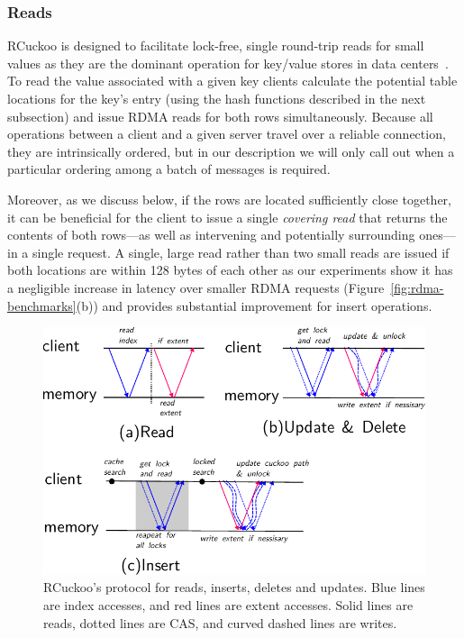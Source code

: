 \subsubsection{Reads} 
\label{sec:reading}


RCuckoo is designed to facilitate lock-free, single round-trip reads
for small values as they are the dominant operation for key/value
stores in data centers~\cite{rocks-db-workload,facebook-memcached}. To
read the value associated with a given key clients calculate the
potential table locations for the key's entry (using the hash
functions described in the next subsection) and issue RDMA reads for
both rows simultaneously.  Because all operations between a client and
a given server travel over a reliable connection, they are
intrinsically ordered, but in our description we will only call out
when a particular ordering among a batch of messages is required.


Moreover, as we discuss below, if the rows are
located sufficiently close together, it can be beneficial for the
client to issue a single \emph{covering read} that returns the
contents of both rows---as well as intervening and potentially
surrounding ones---in a single request.
A single, large read rather than two small reads are issued
if both locations are within
128 bytes of each other as our experiments show it has a negligible
increase in latency over smaller RDMA requests
(Figure~\ref{fig:rdma-benchmarks}(b)) and provides substantial
improvement for insert operations.


\begin{figure}[t]
\includegraphics[width=0.99\linewidth]{fig/message_diagram.pdf}
\caption{RCuckoo's protocol for reads, inserts, deletes and
updates. Blue lines are index accesses, and red lines are
extent accesses. Solid lines are reads, dotted lines are
CAS, and curved dashed lines are writes.}
\label{fig:message_diagram}
\end{figure}


